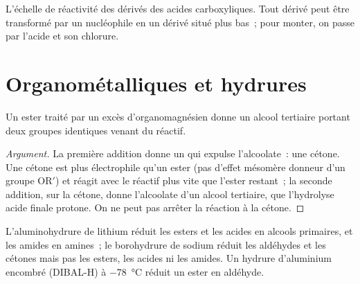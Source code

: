 \begin{omfigure}

{\small L'échelle de réactivité des dérivés des acides carboxyliques. Tout dérivé peut être
transformé par un nucléophile en un dérivé situé plus bas~; pour monter, on passe par l'acide et
son chlorure.}
\end{omfigure}

\section{Organométalliques et hydrures}

\begin{proposition}\label{prop:b2:acyl-substitution:grignard-ester}
Un ester traité par un excès d'organomagnésien donne un alcool tertiaire portant deux groupes
identiques venant du réactif.
\end{proposition}

\begin{proof}[Argument]
La première addition donne un  qui expulse l'alcoolate~: une cétone.
Une cétone est plus électrophile qu'un ester (pas d'effet mésomère donneur d'un groupe $\mathrm{OR'}$)
et réagit avec le réactif plus vite que l'ester restant~; la seconde addition, sur la cétone, donne
l'alcoolate d'un alcool tertiaire, que l'hydrolyse acide finale protone. On ne peut pas arrêter la
réaction à la cétone.
\end{proof}

\begin{proposition}\label{prop:b2:acyl-substitution:hydrides}
L'aluminohydrure de lithium réduit les esters et les acides en alcools primaires, et les amides en
amines~; le borohydrure de sodium réduit les aldéhydes et les cétones mais pas les esters, les
acides ni les amides. Un hydrure d'aluminium encombré (DIBAL-H) à \qty{-78}{\degreeCelsius} réduit
un ester en aldéhyde.
\end{proposition}

